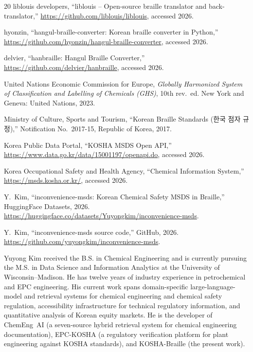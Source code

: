 \documentclass[journal]{IEEEtran}
\begin{document}
\begin{thebibliography}{20}
liblouis developers, ``liblouis -- Open-source braille translator and back-translator,'' \url{https://github.com/liblouis/liblouis}, accessed 2026.

hyonzin, ``hangul-braille-converter: Korean braille converter in Python,'' \url{https://github.com/hyonzin/hangul-braille-converter}, accessed 2026.

delvier, ``hanbraille: Hangul Braille Converter,'' \url{https://github.com/delvier/hanbraille}, accessed 2026.

United Nations Economic Commission for Europe, \emph{Globally Harmonized System of Classification and Labelling of Chemicals (GHS)}, 10th rev.~ed. New York and Geneva: United Nations, 2023.

Ministry of Culture, Sports and Tourism, ``Korean Braille Standards (한국 점자 규정),'' Notification No.~2017-15, Republic of Korea, 2017.

Korea Public Data Portal, ``KOSHA MSDS Open API,'' \url{https://www.data.go.kr/data/15001197/openapi.do}, accessed 2026.

Korea Occupational Safety and Health Agency, ``Chemical Information System,'' \url{https://msds.kosha.or.kr/}, accessed 2026.

Y.~Kim, ``inconvenience-msds: Korean Chemical Safety MSDS in Braille,'' HuggingFace Datasets, 2026. \url{https://huggingface.co/datasets/Yuyongkim/inconvenience-msds}.

Y.~Kim, ``inconvenience-msds source code,'' GitHub, 2026. \url{https://github.com/yuyongkim/inconvenience-msds}.

\end{thebibliography}

\begin{IEEEbiography}[]{Yuyong Kim}
received the B.S. in Chemical Engineering and is currently pursuing the M.S. in Data Science and Information Analytics at the University of Wisconsin--Madison. He has twelve years of industry experience in petrochemical and EPC engineering. His current work spans domain-specific large-language-model and retrieval systems for chemical engineering and chemical safety regulation, accessibility infrastructure for technical regulatory information, and quantitative analysis of Korean equity markets. He is the developer of ChemEng~AI (a seven-source hybrid retrieval system for chemical engineering documentation), EPC-KOSHA (a regulatory verification platform for plant engineering against KOSHA standards), and KOSHA-Braille (the present work).
\end{IEEEbiography}
\end{document}
